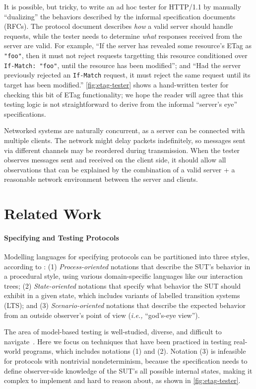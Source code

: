 \documentclass{article}
\newcommand{\http}{HTTP/1.1\xspace}
\newcommand{\inlinec}[1]{\lstinline[style=customc]{#1}}
\theoremstyle{definition}
\begin{document}
It is possible, but tricky, to write an ad hoc tester for \http by manually
``dualizing'' the behaviors described by the informal specification documents
(RFCs).  The protocol document describes {\em how} a valid server should handle
requests, while the tester needs to determine {\em what} responses received from
the server are valid.  For example, ``If the server has revealed some resource's
ETag as \inlinec{"foo"}, then it must not reject requests targetting this
resource conditioned over \inlinec{If-Match: "foo"}, until the resource has been
modified''; and ``Had the server previously rejected an \inlinec{If-Match}
request, it must reject the same request until its target has been modified.''
\autoref{fig:etag-tester} shows a hand-written tester for checking this bit of
ETag functionality; we hope the reader will agree that this testing logic is not
straightforward to derive from the informal ``server's eye'' specifications.

Networked systems are naturally concurrent, as a server can be connected with
multiple clients.  The network might delay packets indefinitely, so messages
sent via different channels may be reordered during transmission.  When the
tester observes messages sent and received on the client side, it should allow
all observations that can be explained by the combination of a valid server + a
reasonable network environment between the server and clients.

\section{Related Work}
\label{sec:related-work}

\paragraph{Specifying and Testing Protocols}
Modelling languages for specifying protocols can be partitioned into three
styles, according to \textcite{anand2013orchestrated}: (1) {\em Process-oriented}
notations that describe the SUT's behavior in a procedural style, using various
domain-specific languages like our interaction trees; (2) {\em State-oriented}
notations that specify what behavior the SUT should exhibit in a given state,
which includes variants of labelled transition systems (LTS); and (3) {\em
  Scenario-oriented} notations that describe the expected behavior from an
outside observer's point of view ({\it i.e.,} ``god's-eye view'').

The area of model-based testing is well-studied, diverse, and difficult to
navigate~\cite{anand2013orchestrated}.  Here we focus on techniques that have
been practiced in testing real-world programs, which includes notations (1) and
(2).  Notation (3) is infeasible for protocols with nontrivial nondeterminism,
because the specification needs to define observer-side knowledge of the SUT's
all possible internal states, making it complex to implement and hard to reason
about, as shown in \autoref{fig:etag-tester}.
\end{document}
